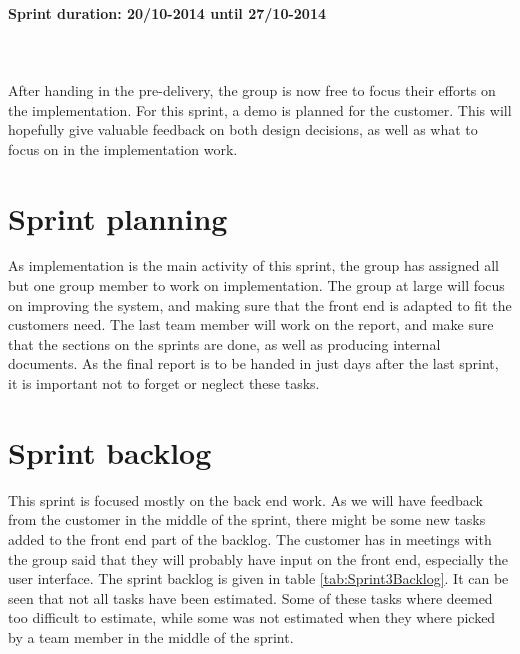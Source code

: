 \documentclass[11pt,a4paper,titlepage,oneside]{report}
\begin{document}
\paragraph{Sprint duration: 20/10-2014 until 27/10-2014} \hfill \\
\\
\noindent
After handing in the \gls{pre-delivery}, the group is now free to focus their efforts on the implementation. For this sprint, a demo is planned for the customer. This will hopefully give valuable feedback on both design decisions, as well as what to focus on in the implementation work.

\section{Sprint planning}
As implementation is the main activity of this sprint, the group has assigned all but one group member to work on implementation. The group at large will focus on improving the system, and making sure that the front end is adapted to fit the customers need. The last team member will work on the report, and make sure that the sections on the sprints are done, as well as producing internal documents. As the final report is to be handed in just days after the last sprint, it is important not to forget or neglect these tasks. 

\section{Sprint backlog}
This sprint is focused mostly on the back end work. As we will have feedback from the customer in the middle of the sprint, there might be some new tasks added to the front end part of the backlog. The customer has in meetings with the group said that they will probably have input on the front end, especially the user interface. The sprint backlog is given in table \ref{tab:Sprint3Backlog}. It can be seen that not all tasks have been estimated. Some of these tasks where deemed too difficult to estimate, while some was not estimated when they where picked by a team member in the middle of the sprint. 
\end{document}
